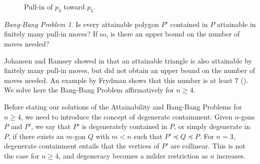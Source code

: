 \documentclass[11pt]{amsart}
\theoremstyle{remark}
\newtheorem*{BangBangProblem}{Bang-Bang Problem}
\numberwithin{equation}{section}
\renewcommand{\precsim}{\preccurlyeq}
\renewcommand{\geq}{\geqslant}
\begin{document}
\begin{figure}[h]
\centering
{}
\caption{Pull-in of $p_3$ toward $p_5$.}
\label{fig_pullin}
\end{figure}



\begin{BangBangProblem}\label{movesproblem}
Is every attainable polygon $P'$ contained in $P$ attainable in finitely many pull-in moves? If so, is there an upper bound on the number of moves needed? 
\end{BangBangProblem}



Johansen and Ramsey showed in \cite{johansen-ramsey} that an attainable triangle is also attainable by finitely many pull-in moves, but did not obtain an upper bound on the number of moves needed. An example by Frydman shows that this number is at least $7$ (\cite{frydman83}). 
We solve here the Bang-Bang Problem affirmatively for $n\geq 4$.


Before stating our solutions of the Attainability and Bang-Bang Problems for $n\geq 4$, we need to introduce the concept of degenerate containment: Given $n$-gons $P$ and $P'$, we say that $P'$ is degenerately contained in $P$, or simply degenerate in $P$, if there exists an $m$-gon $Q$ with $m<n$ such that $P'\precsim Q\precsim P$.  For $n=3$, degenerate containment  entails that the vertices of $P'$ are collinear. This is not the case for $n\geq 4$, and degeneracy becomes a milder restriction as $n$ increases.
\end{document}
